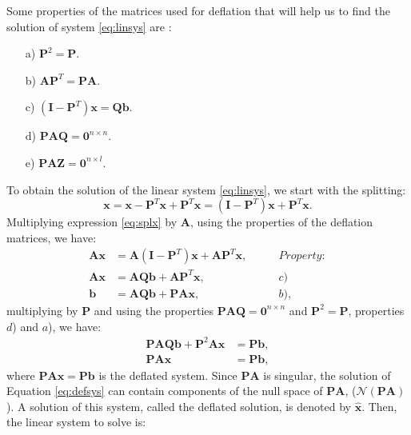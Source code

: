 \documentclass[12pt]{article}
\begin{document}
{Some properties of the matrices used for deflation that will help us to find the solution of system \eqref{eq:linsys} are \cite{Tang08}:
\begin{enumerate}\label{defprop}
 \item[a)] $\mathbf{P}^2=\mathbf{P}.$
 \item[b)] $\mathbf{A}\mathbf{P}^T=\mathbf{P}\mathbf{A}.$
 \item[c)] $(\mathbf{I}-\mathbf{P}^T)\mathbf{x}=\mathbf{Q}\mathbf{b}.$
 \item[d)]$\mathbf{P}\mathbf{A}\mathbf{Q}=\mathbf{0}^{n\times n}.$
  \item[e)]$\mathbf{P}\mathbf{A}\mathbf{Z}=\mathbf{0}^{n\times l}.$
\end{enumerate}
To obtain the solution of the linear system \eqref{eq:linsys}, we start with the splitting:
\begin{equation}\label{eq:splx}
    \mathbf{x}=\mathbf{x}-\mathbf{P}^T\mathbf{x}+\mathbf{P}^T\mathbf{x}=(\mathbf{I}-\mathbf{P}^T)\mathbf{x}+\mathbf{P}^T\mathbf{x}.
\end{equation}
Multiplying expression \eqref{eq:splx} by $\mathbf{A}$, using the properties of the deflation matrices, we have:
\begin{align*}
\mathbf{A}\mathbf{x}&=\mathbf{A}(\mathbf{I}-\mathbf{P}^T)\mathbf{x}+\mathbf{A}\mathbf{P}^T\mathbf{x},\qquad&Property:\\
\mathbf{A}\mathbf{x}&=\mathbf{A}\mathbf{Q}\mathbf{b}+\mathbf{A}\mathbf{P}^T\mathbf{x},&c)\\
\mathbf{b}&=\mathbf{A}\mathbf{Q}\mathbf{b}+\mathbf{P}\mathbf{A}\mathbf{x},&b),
\end{align*}
multiplying by $\mathbf{P}$ and using the properties $\mathbf{P}\mathbf{A}\mathbf{Q}=
\mathbf{0}^{n\times n}$ and $\mathbf{P}^2=\mathbf{P}$, properties $d$) and $a$), we have:
\begin{align*}
\mathbf{P}\mathbf{A}\mathbf{Q}\mathbf{b}+\mathbf{P}^2\mathbf{A}\mathbf{x}&=\mathbf{P}\mathbf{b},\nonumber \\
\mathbf{P}\mathbf{A}\mathbf{x}&=\mathbf{P}\mathbf{b},
\end{align*}
where $\mathbf{P}\mathbf{A}\mathbf{x}=\mathbf{P}\mathbf{b}$ is the deflated system. Since 
$\mathbf{P}\mathbf{A}$ is singular, the solution of Equation \eqref{eq:defsys} can contain
components of the null space of $\mathbf{P}\mathbf{A}$, ($\mathcal{N}(\mathbf{P}\mathbf{A})$).
A solution of this system, called the deflated
solution, is denoted by $\mathbf{\hat{x}}$. Then, the linear system to solve is:\\
}
\end{document}
